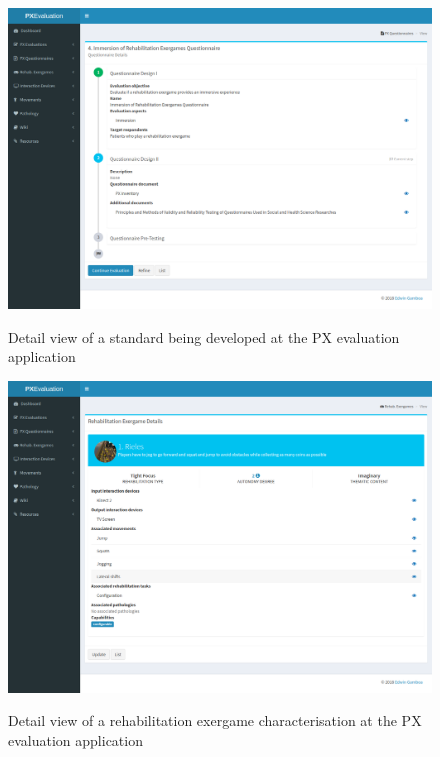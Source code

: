 \begin{figure}[bth]
\myfloatalign
{\includegraphics[width=\linewidth]{gfx/app/standardApp}} \quad
\caption{Detail view of a standard being developed at the \ac{PX} evaluation application}\label{fig:standardApp}
\end{figure}

\begin{figure}[bth]
\myfloatalign
{\includegraphics[width=\linewidth]{gfx/app/characterisingApp}} \quad
\caption{Detail view of a rehabilitation exergame characterisation at the \ac{PX} evaluation application}\label{fig:characterisingApp}
\end{figure}

\clearpage
